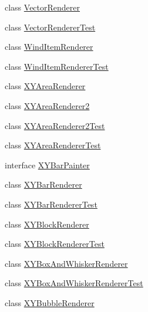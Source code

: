 \begin{DoxyCompactItemize}
\item 
class \mbox{\hyperlink{classorg_1_1jfree_1_1chart_1_1renderer_1_1xy_1_1_vector_renderer}{Vector\+Renderer}}
\item 
class \mbox{\hyperlink{classorg_1_1jfree_1_1chart_1_1renderer_1_1xy_1_1_vector_renderer_test}{Vector\+Renderer\+Test}}
\item 
class \mbox{\hyperlink{classorg_1_1jfree_1_1chart_1_1renderer_1_1xy_1_1_wind_item_renderer}{Wind\+Item\+Renderer}}
\item 
class \mbox{\hyperlink{classorg_1_1jfree_1_1chart_1_1renderer_1_1xy_1_1_wind_item_renderer_test}{Wind\+Item\+Renderer\+Test}}
\item 
class \mbox{\hyperlink{classorg_1_1jfree_1_1chart_1_1renderer_1_1xy_1_1_x_y_area_renderer}{X\+Y\+Area\+Renderer}}
\item 
class \mbox{\hyperlink{classorg_1_1jfree_1_1chart_1_1renderer_1_1xy_1_1_x_y_area_renderer2}{X\+Y\+Area\+Renderer2}}
\item 
class \mbox{\hyperlink{classorg_1_1jfree_1_1chart_1_1renderer_1_1xy_1_1_x_y_area_renderer2_test}{X\+Y\+Area\+Renderer2\+Test}}
\item 
class \mbox{\hyperlink{classorg_1_1jfree_1_1chart_1_1renderer_1_1xy_1_1_x_y_area_renderer_test}{X\+Y\+Area\+Renderer\+Test}}
\item 
interface \mbox{\hyperlink{interfaceorg_1_1jfree_1_1chart_1_1renderer_1_1xy_1_1_x_y_bar_painter}{X\+Y\+Bar\+Painter}}
\item 
class \mbox{\hyperlink{classorg_1_1jfree_1_1chart_1_1renderer_1_1xy_1_1_x_y_bar_renderer}{X\+Y\+Bar\+Renderer}}
\item 
class \mbox{\hyperlink{classorg_1_1jfree_1_1chart_1_1renderer_1_1xy_1_1_x_y_bar_renderer_test}{X\+Y\+Bar\+Renderer\+Test}}
\item 
class \mbox{\hyperlink{classorg_1_1jfree_1_1chart_1_1renderer_1_1xy_1_1_x_y_block_renderer}{X\+Y\+Block\+Renderer}}
\item 
class \mbox{\hyperlink{classorg_1_1jfree_1_1chart_1_1renderer_1_1xy_1_1_x_y_block_renderer_test}{X\+Y\+Block\+Renderer\+Test}}
\item 
class \mbox{\hyperlink{classorg_1_1jfree_1_1chart_1_1renderer_1_1xy_1_1_x_y_box_and_whisker_renderer}{X\+Y\+Box\+And\+Whisker\+Renderer}}
\item 
class \mbox{\hyperlink{classorg_1_1jfree_1_1chart_1_1renderer_1_1xy_1_1_x_y_box_and_whisker_renderer_test}{X\+Y\+Box\+And\+Whisker\+Renderer\+Test}}
\item 
class \mbox{\hyperlink{classorg_1_1jfree_1_1chart_1_1renderer_1_1xy_1_1_x_y_bubble_renderer}{X\+Y\+Bubble\+Renderer}}

\end{DoxyCompactItemize}
